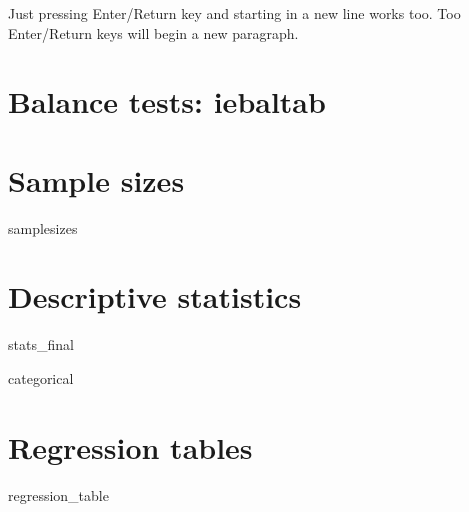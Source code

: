 \documentclass{article}
\begin{document}
Just pressing Enter/Return key and starting in a new line works too. Too Enter/Return keys will begin a new paragraph.


\newpage
\section{Balance tests: iebaltab}

\section{Sample sizes}
	\begin{table}[H]
		\centering
		\caption{Sample sizes}
			{samplesizes}
	\end{table}

\section{Descriptive statistics}

	\begin{table}[H]
		\centering
		\caption{Descriptive statistics for numeric variables}
			{stats_final}
	\end{table}

	\begin{table}[H]
		\centering
		\caption{Descriptive statistics for categorical variables}
		\begin{adjustbox}{max width=\textwidth}
			{categorical}
		\end{adjustbox}
	\end{table}

\section{Regression tables}

	\begin{table}[H]
		\centering
		\caption{Outcome variable: life expectancy at birth}
		\begin{adjustbox}{max width=\textwidth}
			{regression_table}
		\end{adjustbox}
	\end{table}
\end{document}
